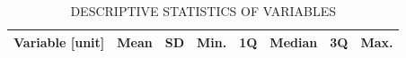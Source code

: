 \begin{table}[!htbp]
    \footnotesize
    \captionsetup{justification=raggedright,
        singlelinecheck=false,
        font=footnotesize}
    \caption{DESCRIPTIVE STATISTICS OF VARIABLES}
    \centering
    \begin{tabular}{lrrrrrrr}
        \hline
        \multicolumn{1}{c}{\textbf{Variable [unit]}} & \multicolumn{1}{c}{\textbf{Mean}} & \multicolumn{1}{c}{\textbf{SD}} & \multicolumn{1}{c}{\textbf{Min.}} & \multicolumn{1}{c}{\textbf{1Q}} & \multicolumn{1}{c}{\textbf{Median}} & \multicolumn{1}{c}{\textbf{3Q}} & \multicolumn{1}{c}{\textbf{Max.}} \\ 
        \hline


\end{tabular}
\end{table}
